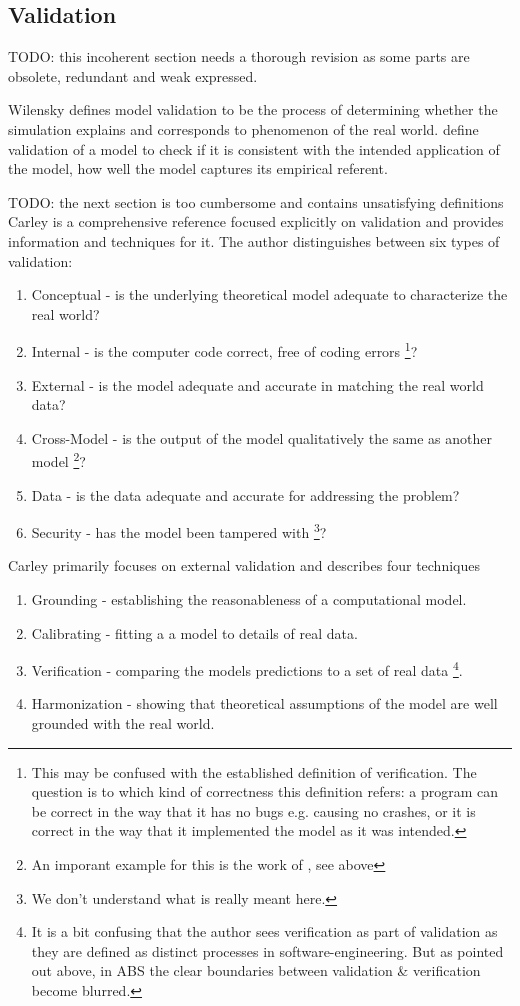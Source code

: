 \subsection{Validation}
TODO: this incoherent section needs a thorough revision as some parts are obsolete, redundant and weak expressed.

Wilensky \cite{wilensky_making_2007} defines model validation to be the process of determining whether the simulation explains and corresponds to phenomenon of the real world. \cite{galan_errors_2009} define validation of a model to check if it is consistent with the intended application of the model, how well the model captures its empirical referent.

TODO: the next section is too cumbersome and contains unsatisfying definitions
Carley \cite{carley_validating_1996} is a comprehensive reference focused explicitly on validation and provides information and techniques for it. The author distinguishes between six types of validation:
\begin{enumerate}
	\item Conceptual - is the underlying theoretical model adequate to characterize the real world?
	\item Internal - is the computer code correct, free of coding errors \footnote{This may be confused with the established definition of verification. The question is to which kind of correctness this definition refers: a program can be correct in the way that it has no bugs e.g. causing no crashes, or it is correct in the way that it implemented the model as it was intended.}?
	\item External - is the model adequate and accurate in matching the real world data?
	\item Cross-Model - is the output of the model qualitatively the same as another model \footnote{An imporant example for this is the work of \cite{axtell_aligning_1996}, see above}?
	\item Data - is the data adequate and accurate for addressing the problem?
	\item Security - has the model been tampered with \footnote{We don't understand what is really meant here.}?
\end{enumerate}
Carley primarily focuses on external validation and describes four techniques 
\begin{enumerate}
	\item Grounding - establishing the reasonableness of a computational model.
	\item Calibrating - fitting a a model to details of real data.
	\item Verification - comparing the models predictions to a set of real data \footnote{It is a bit confusing that the author sees verification as part of validation as they are defined as distinct processes in software-engineering. But as pointed out above, in ABS the clear boundaries between validation \& verification become blurred.}.
	\item Harmonization - showing that theoretical assumptions of the model are well grounded with the real world.
\end{enumerate}

